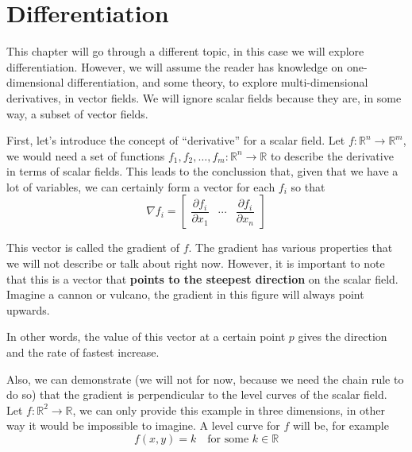 \documentclass[../linear-spaces.tex]{subfiles}
\begin{document}
\chapter{Differentiation}

This chapter will go through a different topic, in this case we will explore differentiation.
However, we will assume the reader has knowledge on one-dimensional differentiation, and some
theory, to explore multi-dimensional derivatives, in vector fields. We will ignore scalar fields 
because they are, in some way, a subset of vector fields.

First, let's introduce the concept of ``derivative'' for a scalar field. Let $f: \mathbb{R}^{n} \to \mathbb{R}^{m}$,
we would need a set of functions $f_1,f_2,\dots,f_m: \mathbb{R}^{n} \to \mathbb{R}$ to describe the 
derivative in terms of scalar fields. This leads to the conclussion that, given that we have a lot of variables, we 
can certainly form a vector for each $f_i$ so that 
\begin{equation*}
    \nabla f_i = 
    \begin{bmatrix} 
        \dfrac{\partial f_i}{\partial x_1} & \cdots & \dfrac{\partial f_i}{\partial x_n} 
    \end{bmatrix}
\end{equation*}

This vector is called the gradient of $f$. The gradient has various properties that we will not describe or talk about right now. 
However, it is important to note that this is a vector that \textbf{points to the steepest direction} on the scalar field. Imagine 
a cannon or vulcano, the gradient in this figure will always point upwards.

In other words, the value of this vector at a certain point $p$ gives the direction and the rate of fastest increase.

Also, we can demonstrate (we will not for now, because we need the chain rule to do so) that the gradient is perpendicular to the 
level curves of the scalar field. Let $f: \mathbb{R}^{2} \to \mathbb{R}$, we can only provide this example in three dimensions, 
in other way it would be impossible to imagine. A level curve for $f$ will be, for example 
\begin{equation}
    f(x,y)=k\quad \text{for some } k \in \mathbb{R}
\end{equation}
\end{document}
